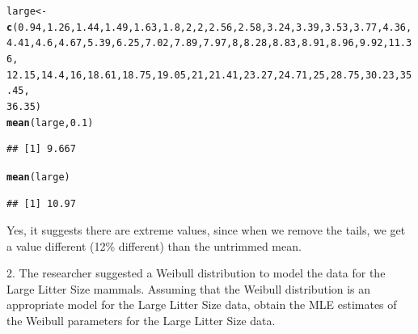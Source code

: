 \documentclass{article}\usepackage{graphicx, color}
\makeatletter
\newcommand{\hlfunctioncall}[1]{\textcolor[rgb]{0.501960784313725,0,0.329411764705882}{\textbf{#1}}}%
\newenvironment{kframe}{%
 \def\at@end@of@kframe{}%
 \ifinner\ifhmode%
  \def\at@end@of@kframe{\end{minipage}}%
  \begin{minipage}{\columnwidth}%
 \fi\fi%
 \def\FrameCommand##1{\hskip\@totalleftmargin \hskip-\fboxsep
 \colorbox{shadecolor}{##1}\hskip-\fboxsep
     \hskip-\linewidth \hskip-\@totalleftmargin \hskip\columnwidth}%
 \MakeFramed {\advance\hsize-\width
   \@totalleftmargin\z@ \linewidth\hsize
   \@setminipage}}%
 {\par\unskip\endMakeFramed%
 \at@end@of@kframe}
\newenvironment{knitrout}{}{} %
\makeatother
\begin{document}
\begin{shaded}
\begin{knitrout}
\color{fgcolor}\begin{kframe}
\begin{alltt}
large <- \hlfunctioncall{c}(0.94, 1.26, 1.44, 1.49, 1.63, 1.8, 2, 2, 2.56, 2.58, 3.24, 3.39, 3.53, 3.77, 4.36, 
    4.41, 4.6, 4.67, 5.39, 6.25, 7.02, 7.89, 7.97, 8, 8.28, 8.83, 8.91, 8.96, 9.92, 11.36, 
    12.15, 14.4, 16, 18.61, 18.75, 19.05, 21, 21.41, 23.27, 24.71, 25, 28.75, 30.23, 35.45, 
    36.35)
\hlfunctioncall{mean}(large, 0.1)
\end{alltt}
\begin{verbatim}
## [1] 9.667
\end{verbatim}
\begin{alltt}
\hlfunctioncall{mean}(large)
\end{alltt}
\begin{verbatim}
## [1] 10.97
\end{verbatim}
\end{kframe}
\end{knitrout}

Yes, it suggests there are extreme values, since when we remove the tails,
we get a value different (12\% different) than the untrimmed mean.
\end{shaded}
\item[2.] The researcher suggested a Weibull distribution to model the data for the Large Litter Size mammals. Assuming that the Weibull distribution is an appropriate model for the Large Litter Size data, obtain the MLE estimates of the Weibull parameters for the Large Litter Size data.
\end{document}
